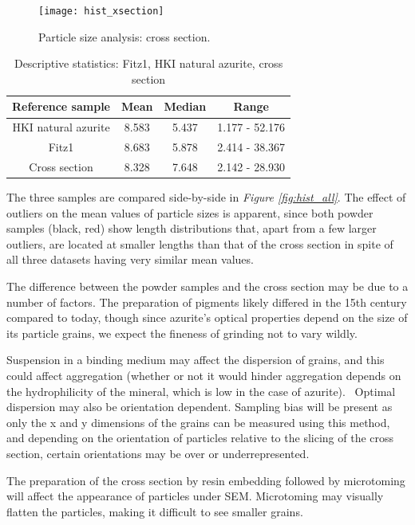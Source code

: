 \begin{figure}[H]
\centering
  \texttt{[image: hist\_xsection]}
\caption[Particle size analysis: cross section]{Particle size analysis: cross section.} 
\label{fig:hist_xsec}
\end{figure}

\begin{table}[H]
\caption{Descriptive statistics: Fitz1, HKI natural azurite, cross section}
\centering
\label{table:r_stats}
\begin{tabular}{c c c c}
\toprule
Reference sample & Mean & Median & Range \\
\midrule
HKI natural azurite & 8.583 & 5.437 & 1.177 - 52.176 \\
Fitz1 & 8.683 & 5.878 & 2.414 - 38.367 \\
Cross section & 8.328 & 7.648 & 2.142 - 28.930 \\
\bottomrule
\end{tabular}
\end{table}

The three samples are compared side-by-side in \textit{Figure \ref{fig:hist_all}}. The effect of outliers on the mean values of particle sizes is apparent, since both powder samples (black, red) show length distributions that, apart from a few larger outliers, are located at smaller lengths than that of the cross section in spite of all three datasets having very similar mean values. 

The difference between the powder samples and the cross section may be due to a number of factors. The preparation of pigments likely differed in the 15th century compared to today, though since azurite's optical properties depend on the size of its particle grains, we expect the fineness of grinding not to vary wildly. 

Suspension in a binding medium may affect the dispersion of grains, and this could affect aggregation (whether or not it would hinder aggregation depends on the hydrophilicity of the mineral, which is low in the case of azurite).~\autocite{Zhang} Optimal dispersion may also be orientation dependent. Sampling bias will be present as only the x and y dimensions of the grains can be measured using this method, and depending on the orientation of particles relative to the slicing of the cross section, certain orientations may be over or underrepresented. 

The preparation of the cross section by resin embedding followed by microtoming will affect the appearance of particles under SEM. Microtoming may visually flatten the particles, making it difficult to see smaller grains. 

